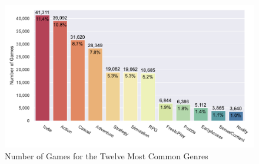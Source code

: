 \begin{figure}[h]
    \centering
    \includegraphics[width=.9\textwidth]{data/results/plots/tags_plot}
    \caption{Number of Games for the Twelve Most Common Genres}
    \label{fig:genre_plot}
\end{figure}